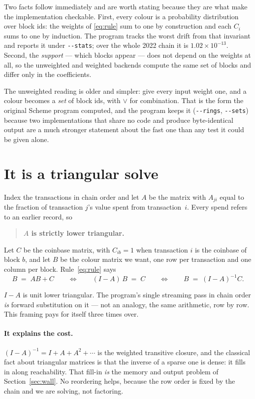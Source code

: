 \documentclass[11pt,a4paper]{article}
\newcommand{\flag}[1]{\texttt{-{}-#1}}
\begin{document}
Two facts follow immediately and are worth stating because they are what make
the implementation checkable. First, every colour is a probability distribution
over block ids: the weights of \eqref{eq:rule} sum to one by construction and
each $C_i$ sums to one by induction. The program tracks the worst drift from
that invariant and reports it under \flag{stats}; over the whole 2022 chain it
is $1.02\times10^{-13}$. Second, the \emph{support} --- which blocks appear ---
does not depend on the weights at all, so the unweighted and weighted backends
compute the same set of blocks and differ only in the coefficients.

The unweighted reading is older and simpler: give every input weight one, and a
colour becomes a \emph{set} of block ids, with $\vee$ for combination. That is
the form the original Scheme program computed, and the program keeps it
(\flag{rings}, \flag{sets}) because two implementations that share no code and
produce byte-identical output are a much stronger statement about the fast one
than any test it could be given alone.

\section{It is a triangular solve}

Index the transactions in chain order and let $A$ be the matrix with
$A_{ji}$ equal to the fraction of transaction $j$'s value spent from
transaction~$i$. Every spend refers to an earlier record, so

\begin{quote}
  \textbf{$A$ is strictly lower triangular.}
\end{quote}

Let $C$ be the coinbase matrix, with $C_{ib}=1$ when transaction $i$ is the
coinbase of block $b$, and let $B$ be the colour matrix we want, one row per
transaction and one column per block. Rule~\eqref{eq:rule} says
\begin{equation}
  B \;=\; AB + C
  \qquad\Longleftrightarrow\qquad
  (I-A)\,B \;=\; C
  \qquad\Longleftrightarrow\qquad
  B \;=\; (I-A)^{-1} C .
  \label{eq:solve}
\end{equation}

$I-A$ is unit lower triangular. The program's single streaming pass in chain
order \emph{is} forward substitution on it --- not an analogy, the same
arithmetic, row by row. This framing pays for itself three times over.

\paragraph{It explains the cost.} $(I-A)^{-1} = I + A + A^2 + \cdots$ is the
weighted transitive closure, and the classical fact about triangular matrices is
that the inverse of a sparse one is dense: it fills in along reachability. That
fill-in \emph{is} the memory and output problem of
Section~\ref{sec:wall}. No reordering helps, because the row order is fixed by
the chain and we are solving, not factoring.
\end{document}
